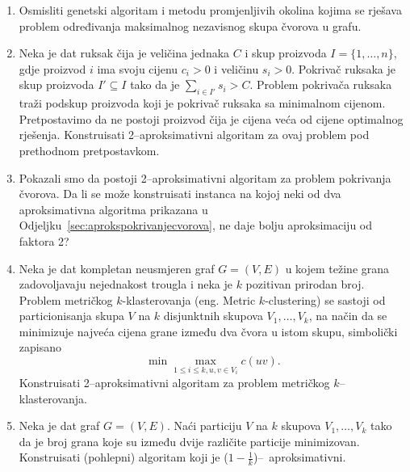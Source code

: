 \documentclass[b5paper, utf8, 11pt, colorlinks]{book}
\theoremstyle{definition}
\begin{document}
\begin{enumerate}
		\item Osmisliti genetski algoritam i metodu promjenljivih okolina kojima se rješava problem određivanja maksimalnog nezavisnog skupa čvorova u grafu.
		\item %
		   Neka je dat ruksak čija je veličina jednaka $C$ i skup proizvoda $I = \{1,\ldots, n\}$, gdje proizvod $i$ ima svoju cijenu $c_i>0$ i veličinu $s_i>0$. Pokrivač ruksaka je skup proizvoda $I' \subseteq I$ tako da je $\sum_{i \in I'} s_i > C$.  Problem pokrivača ruksaka traži podskup proizvoda koji je pokrivač ruksaka sa minimalnom    cijenom.   Pretpostavimo da ne postoji proizvod čija je cijena veća od    cijene optimalnog rješenja. Konstruisati 2--aproksimativni algoritam za ovaj problem pod prethodnom pretpostavkom. 
		   \item Pokazali smo da postoji 2--aproksimativni algoritam za problem pokrivanja čvorova. Da li se može konstruisati instanca na kojoj neki od dva aproksimativna algoritma prikazana u Odjeljku~\ref{sec:aprokspokrivanjecvorova}, ne daje bolju aproksimaciju od faktora 2? 
 
		   \item %
		   Neka je dat kompletan neusmjeren graf $G = (V, E)$ u kojem težine grana zadovoljavaju nejednakost trougla i neka je $k$ pozitivan prirodan broj. Problem metričkog $k$-klasterovanja (eng. Metric $k$-clustering)  se sastoji od particionisanja skupa $V$ na $k$ disjunktnih skupova $V_1, \ldots, V_k$, na način da se  minimizuje najveća cijena grane  između dva čvora u istom skupu, simbolički zapisano
		   $$ \min\max_{1 \leq i \leq k, u,v \in V_i} c(uv).$$
		   Konstruisati 2--aproksimativni algoritam za problem metričkog $k$--kla\-sterovanja. 
		\item %
		 Neka je dat   graf $G=(V,E)$. Naći particiju $V$ na $k$ skupova $V_1,\ldots, V_k$ tako da je broj grana koje su između dvije različite particije minimizovan. Konstruisati (pohlepni) algoritam koji je ($1-\frac{1}{k}$)--~aproksimativni. 
		 
 

 

\end{enumerate}
\end{document}
